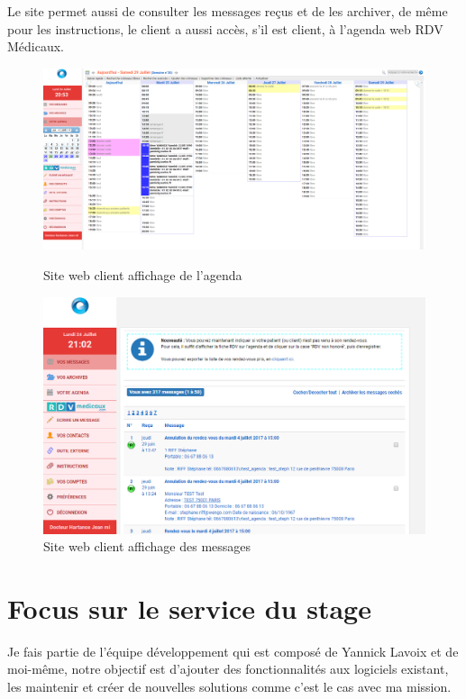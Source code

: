 Le site permet aussi de consulter les messages reçus et de les archiver, de même pour les instructions,
le client a aussi accès, s'il est client, à l'agenda web RDV Médicaux.\newline
\begin{figure}[!h]
	\centering
	\includegraphics[width=0.8\linewidth]{Images/web2agenda}
	\caption{Site web client affichage de l'agenda}
	\label{fig:web2agenda}

	\centering
	\includegraphics[width=0.8\linewidth]{Images/web2messages}
	\caption{Site web client affichage des messages }
	\label{fig:web2messages}
\end{figure}
\newpage



\section{Focus sur le service du stage}
Je fais partie de l'équipe développement qui est composé de Yannick Lavoix et de moi-même, 
notre objectif est d'ajouter des fonctionnalités aux logiciels existant, 
les maintenir et créer de nouvelles solutions comme c'est le cas avec ma mission.\newline

